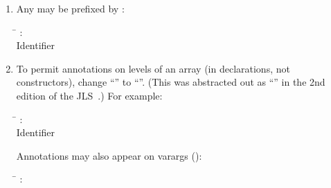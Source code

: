 \documentclass[10pt]{article}
\begin{document}
\begin{enumerate}
\item
Any  may be prefixed by :

\begin{tabbing}
\qquad \= \kill
    : \\
\qquad            {} Identifier   \multi{\term{[]}} \\
\qquad            {} 
\end{tabbing}


% 
% 


\item
To permit annotations on levels of an array (in declarations, not
constructors), change ``\multi{\term{[]}}''  to
``''.
(This was abstracted out as
``'' in the 2nd edition of the JLS~\cite{GoslingJSB2000}.)
For example:

\begin{tabbing}
\qquad \= \kill
    : \\
\qquad            {} Identifier   \\
\qquad            {} 
\end{tabbing}

Annotations may also appear on varargs ():

\begin{tabbing}
\qquad \= \kill
    : \\
\qquad             {}  \\
\qquad            {}  
\end{tabbing}



\end{enumerate}
\end{document}
